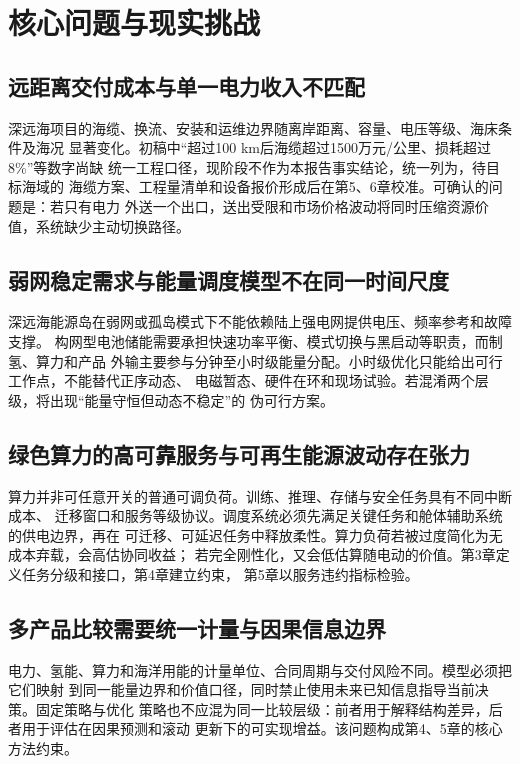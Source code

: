 \section{核心问题与现实挑战}

\subsection{远距离交付成本与单一电力收入不匹配}

深远海项目的海缆、换流、安装和运维边界随离岸距离、容量、电压等级、海床条件及海况
显著变化。初稿中“超过100 km后海缆超过1500万元/公里、损耗超过8\%”等数字尚缺
统一工程口径，现阶段不作为本报告事实结论，统一列为\assumptiontag，待目标海域的
海缆方案、工程量清单和设备报价形成后在第5、6章校准。可确认的问题是：若只有电力
外送一个出口，送出受限和市场价格波动将同时压缩资源价值，系统缺少主动切换路径。

\subsection{弱网稳定需求与能量调度模型不在同一时间尺度}

深远海能源岛在弱网或孤岛模式下不能依赖陆上强电网提供电压、频率参考和故障支撑。
构网型电池储能需要承担快速功率平衡、模式切换与黑启动等职责，而制氢、算力和产品
外输主要参与分钟至小时级能量分配。小时级优化只能给出可行工作点，不能替代正序动态、
电磁暂态、硬件在环和现场试验。若混淆两个层级，将出现“能量守恒但动态不稳定”的
伪可行方案。

\subsection{绿色算力的高可靠服务与可再生能源波动存在张力}

算力并非可任意开关的普通可调负荷。训练、推理、存储与安全任务具有不同中断成本、
迁移窗口和服务等级协议。调度系统必须先满足关键任务和舱体辅助系统的供电边界，再在
可迁移、可延迟任务中释放柔性。算力负荷若被过度简化为无成本弃载，会高估协同收益；
若完全刚性化，又会低估算随电动的价值。第3章定义任务分级和接口，第4章建立约束，
第5章以服务违约指标检验。

\subsection{多产品比较需要统一计量与因果信息边界}

电力、氢能、算力和海洋用能的计量单位、合同周期与交付风险不同。模型必须把它们映射
到同一能量边界和价值口径，同时禁止使用未来已知信息指导当前决策。固定策略与优化
策略也不应混为同一比较层级：前者用于解释结构差异，后者用于评估在因果预测和滚动
更新下的可实现增益。该问题构成第4、5章的核心方法约束。

